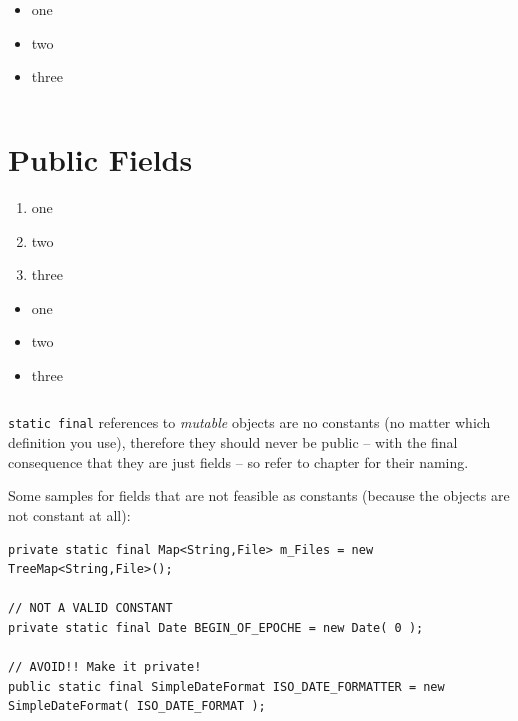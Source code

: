 \begin{itemize}[nosep]
\item{one}
\item{two}
\item{three}
\end{itemize}

\begin{lstlisting}[numbers=left]
\end{lstlisting}
\hrulefill\newpage 
\section{Public Fields}
\lipsum[1]

\begin{enumerate}[label=P\arabic*.]
\item{one}
\item{two}
\item{three}
\end{enumerate}

\begin{itemize}[nosep]
\item{one}
\item{two}
\item{three}
\end{itemize}

\begin{lstlisting}[numbers=left]
\end{lstlisting}
\lstinline|static final| references to \textit{mutable} objects are no constants (no matter which definition you use), therefore they should never be public – with the final consequence that they are just fields – so refer to chapter  for their naming.

Some samples for fields that are not feasible as constants (because the objects are not constant at all):
\begin{lstlisting}
private static final Map<String,File> m_Files = new TreeMap<String,File>();

// NOT A VALID CONSTANT
private static final Date BEGIN_OF_EPOCHE = new Date( 0 );

// AVOID!! Make it private!
public static final SimpleDateFormat ISO_DATE_FORMATTER = new SimpleDateFormat( ISO_DATE_FORMAT );
\end{lstlisting}

